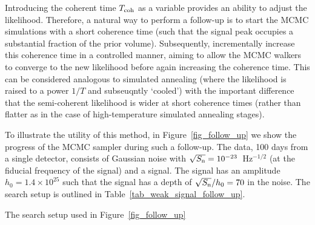 \documentclass[aps, prd, twocolumn, superscriptaddress, floatfix, showpacs, nofootinbib, longbibliography]{revtex4-1}
\begin{document}
Introducing the coherent time $T_{\rm coh}$ as a variable provides an ability to
adjust the likelihood. Therefore, a natural way to perform a follow-up is to
start the MCMC simulations with a short coherence time (such that the signal
peak occupies a substantial fraction of the prior volume). Subsequently,
incrementally increase this coherence time in a controlled manner, aiming to
allow the MCMC walkers to converge to the new likelihood before again
increasing the coherence time. This can be considered analogous to simulated
annealing (where the likelihood is raised to a power $1/T$ and subseuqntly
`cooled') with the important difference that the semi-coherent likelihood is
wider at short coherence times (rather than flatter as in the case of
high-temperature simulated annealing stages).

To illustrate the utility of this method, in Figure~\ref{fig_follow_up} we show
the progress of the MCMC sampler during such a follow-up. The data, 100 days
from a single detector, consists of Gaussian noise with
$\sqrt{S_{\rm n}}=10^{-23}$~Hz$^{-1/2}$ (at the fiducial frequency of the signal) and
a signal. The signal has an amplitude $h_0=1.4\times10^{25}$ such that the
signal has a depth of $\sqrt{S_{\rm n}}/h_0=70$ in the noise. The search setup is
outlined in Table~\ref{tab_weak_signal_follow_up}.

\begin{table}[htb]
\caption{The search setup used in Figure~\ref{fig_follow_up}}
\label{tab_weak_signal_follow_up}

\end{table}
\end{document}
